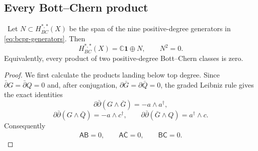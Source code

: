 \subsection{Every Bott--Chern product}

\begin{theorem}
\label{thm:bcpr-square-zero-algebra}
\Verified\ Let $N\subset H^{*,*}_{BC}(X)$ be the span of the nine positive-degree
generators in \cref{eq:bcpr-generators}.  Then
\begin{equation}
 H^{*,*}_{BC}(X)=\mathbb C\mathbf1\oplus N,
 \qquad N^2=0.
\label{eq:bcpr-algebra}
\end{equation}
Equivalently, every product of two positive-degree Bott--Chern classes is
zero.
\end{theorem}

\begin{proof}
We first calculate the products landing below top degree.  Since
$\bar\partial G=\bar\partial Q=0$ and, after conjugation,
$\partial\bar G=\partial\bar Q=0$, the graded Leibniz rule gives the exact
identities
\begin{equation}
 \partial\bar\partial(G\wedge\bar G)
 =-a\wedge a^\dagger,
\label{eq:bcpr-product-ab}
\end{equation}
\begin{equation}
 \partial\bar\partial(G\wedge\bar Q)
 =-a\wedge c^\dagger,
 \qquad
 \partial\bar\partial(\bar G\wedge Q)
 =a^\dagger\wedge c.
\label{eq:bcpr-product-acbar-bc}
\end{equation}
Consequently
\begin{equation}
 \mathsf A\mathsf B=0,\qquad
 \mathsf A\overline{\mathsf C}=0,\qquad
 \mathsf B\mathsf C=0.
\label{eq:bcpr-first-zero-products}
\end{equation}


\end{proof}
